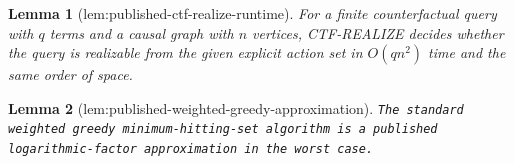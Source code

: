 \documentclass{article}
\newtheorem{lemma}{Lemma}
\begin{document}
\begin{lemma}[lem:published-ctf-realize-runtime]\label{lem:published-ctf-realize-runtime}
For a finite counterfactual query with \(q\) terms and a causal graph with \(n\) vertices, CTF-REALIZE decides whether the query is realizable from the given explicit action set in \(O(qn^2)\) time and the same order of space.
\end{lemma}

\begin{lemma}[lem:published-weighted-greedy-approximation]\label{lem:published-weighted-greedy-approximation}
\texttt{The standard weighted greedy minimum-\allowbreak{}hitting-\allowbreak{}set algorithm is a published logarithmic-\allowbreak{}factor approximation in the worst case.}
\end{lemma}
\end{document}
